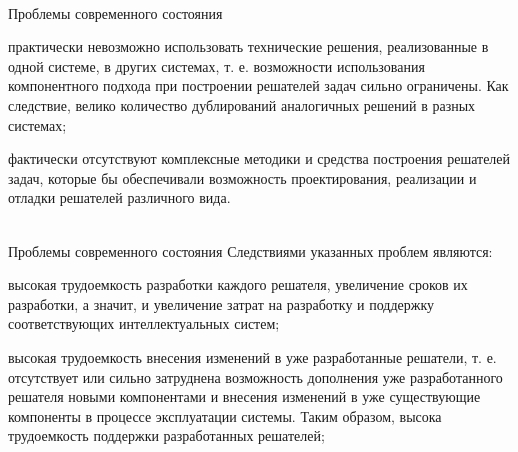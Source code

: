 \begin{frame}{\\Проблемы современного состояния}
	\topline
	\justifying
	\begin{textitemize}
		\item практически невозможно использовать технические решения, реализованные в одной системе, в других системах, т. е. возможности использования компонентного подхода при построении решателей задач сильно ограничены. Как следствие, велико количество дублирований аналогичных решений в разных системах;
		\item фактически отсутствуют комплексные методики и средства построения решателей задач, которые бы обеспечивали возможность проектирования, реализации и отладки решателей различного вида.
	\end{textitemize}
\end{frame}

\begin{frame}{\\Проблемы современного состояния}
	\topline
	\justifying
	Следствиями указанных проблем являются:
	\begin{textitemize}
		\item высокая трудоемкость разработки каждого решателя, увеличение сроков их разработки, а значит, и увеличение затрат на разработку и поддержку соответствующих интеллектуальных систем;
		\item высокая трудоемкость внесения изменений в уже разработанные решатели, т. е. отсутствует или сильно затруднена возможность дополнения уже разработанного решателя новыми компонентами и внесения изменений в уже существующие компоненты в процессе эксплуатации системы. Таким образом, высока трудоемкость поддержки разработанных решателей;
	\end{textitemize}
\end{frame}

